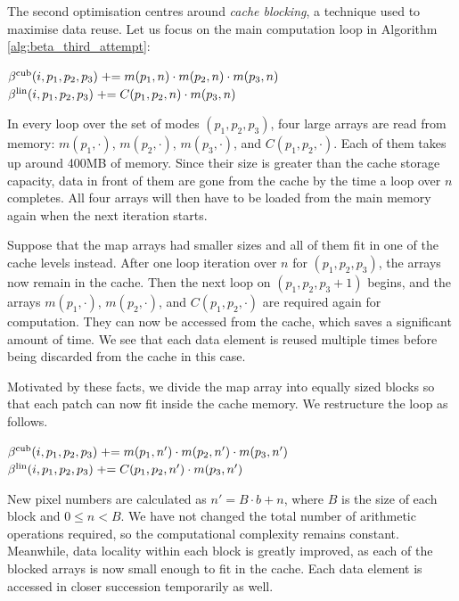 The second optimisation centres around \textit{cache blocking}, a technique used to maximise data reuse. Let us focus on the main computation loop in Algorithm \ref{alg:beta_third_attempt}:

\begin{algorithmic}
			\State $\beta^\text{cub}(i, p_1, p_2, p_3) \mathrel{+}= m(p_1,n) \cdot m(p_2,n) \cdot m(p_3,n)$
			\State $\beta^\text{lin}(i, p_1, p_2, p_3) \mathrel{+}= C(p_1, p_2, n) \cdot m( p_3, n)$
		\EndFor
	\EndFor
\end{algorithmic}

In every loop over the set of modes $(p_1, p_2, p_3)$, four large arrays are read from memory: $m(p_1,\cdot)$, $m(p_2,\cdot)$, $m(p_3,\cdot)$, and $C(p_1, p_2, \cdot)$. Each of them takes up around 400MB of memory. Since their size is greater than the cache storage capacity, data in front of them are gone from the cache by the time a loop over $n$ completes. All four arrays will then have to be loaded from the main memory again when the next iteration starts.

Suppose that the map arrays had smaller sizes and all of them fit in one of the cache levels instead. After one loop iteration over $n$ for $(p_1, p_2, p_3)$, the arrays now remain in the cache. Then the next loop on $(p_1, p_2, p_3+1)$ begins, and the arrays $m(p_1,\cdot)$, $m(p_2,\cdot)$, and $C(p_1,p_2,\cdot)$ are required again for computation. They can now be accessed from the cache, which saves a significant amount of time. We see that each data element is reused multiple times before being discarded from the cache in this case.

Motivated by these facts, we divide the map array into equally sized blocks so that each patch can now fit inside the cache memory. We restructure the loop as follows.

\begin{algorithmic}
				\State $\beta^\text{cub}(i, p_1, p_2, p_3) \mathrel{+}= m(p_1,n') \cdot m(p_2,n') \cdot m(p_3,n')$
				\State $\beta^\text{lin}(i, p_1, p_2, p_3) \mathrel{+}= C(p_1, p_2, n') \cdot m( p_3, n')$
			\EndFor
		\EndFor
	\EndFor
\end{algorithmic}

New pixel numbers are calculated as $n' = B \cdot b + n$, where $B$ is the size of each block and $0 \le n < B$. We have not changed the total number of arithmetic operations required, so the computational complexity remains constant. Meanwhile, data locality within each block is greatly improved, as each of the blocked arrays is now small enough to fit in the cache. Each data element is accessed in closer succession temporarily as well.

